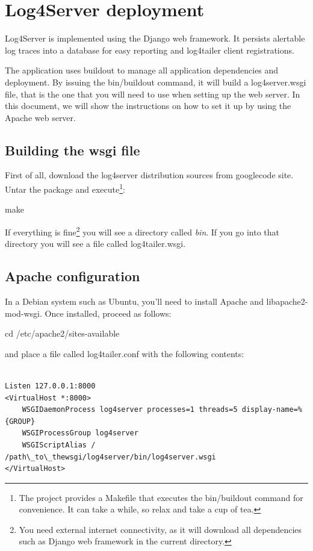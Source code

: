 \section{Log4Server deployment}
Log4Server is implemented using the Django web framework. It persists alertable
log traces into a database for easy reporting and log4tailer client
registrations. 

The application uses buildout to manage all application dependencies and
deployment. By issuing the bin/buildout command, it will build a
log4server.wsgi file, that is the one that you will need to use when setting up
the web server. In this document, we will show the instructions on how to set
it up by using the Apache web server. 

\subsection{Building the wsgi file}

First of all, download the log4server distribution sources from googlecode
site. Untar the package and execute\footnote{The project provides a Makefile
that executes the bin/buildout command for convenience. It can take a while, so 
relax and take a cup of tea.}:

\begin{cmd}
    make
\end{cmd}
If everything is fine\footnote{You need external internet connectivity, as it
will download all dependencies such as Django web framework in the current
directory.} you will see a directory called \emph{bin}. If you go
into that directory you will see a file called log4tailer.wsgi. 

\subsection{Apache configuration}
In a Debian system such as Ubuntu, you'll need to install Apache and
libapache2-mod-wsgi. Once installed, proceed as follows:

\begin{cmd}
    cd /etc/apache2/sites-available
\end{cmd}
and place a file called log4tailer.conf with the following contents:

\begin{config}
\begin{verbatim}

Listen 127.0.0.1:8000
<VirtualHost *:8000>
    WSGIDaemonProcess log4server processes=1 threads=5 display-name=%{GROUP}
    WSGIProcessGroup log4server
    WSGIScriptAlias / /path\_to\_thewsgi/log4server/bin/log4server.wsgi
</VirtualHost>

\end{verbatim}
\end{config}

